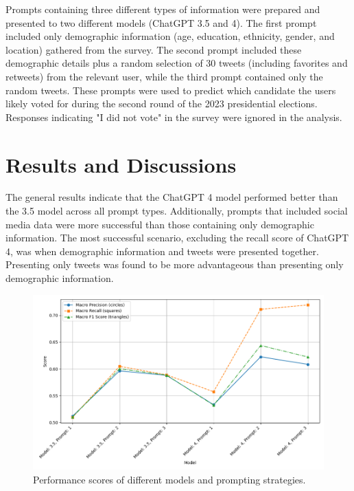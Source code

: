 \documentclass[sigconf,natbib=false]{acmart}
\begin{document}
Prompts containing three different types of information were prepared and presented to two different models (ChatGPT 3.5 and 4). The first prompt included only demographic information (age, education, ethnicity, gender, and location) gathered from the survey. The second prompt included these demographic details plus a random selection of 30 tweets (including favorites and retweets) from the relevant user, while the third prompt contained only the random tweets. These prompts were used to predict which candidate the users likely voted for during the second round of the 2023 presidential elections. Responses indicating "I did not vote" in the survey were ignored in the analysis.


\section{Results and Discussions}
The general results indicate that the ChatGPT 4 model performed better than the 3.5 model across all prompt types. Additionally, prompts that included social media data were more successful than those containing only demographic information. The most successful scenario, excluding the recall score of ChatGPT 4, was when demographic information and tweets were presented together. Presenting only tweets was found to be more advantageous than presenting only demographic information.

\begin{figure}[ht]
  \centering
  \includegraphics[width=\linewidth]{graph1.png}
  \caption{Performance scores of different models and prompting strategies.}
  \label{fig:graph1}
\end{figure}
\end{document}
